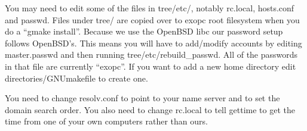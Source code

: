 \documentclass[11pt]{article}
\begin{document}
You may need to edit some of the files in tree/etc/, notably rc.local,
hosts.conf and passwd. Files under tree/ are copied over to exopc root
filesystem when you do a ``gmake install''. Because we use the OpenBSD
libc our password setup follows OpenBSD's. This means you will have to
add/modify accounts by editing master.passwd and then running
tree/etc/rebuild\_passwd. All of the passwords in that file are
currently ``exopc''. If you want to add a new home directory edit
directories/GNUmakefile to create one.

You need to change resolv.conf to point to your name server and to set
the domain search order. You also need to change rc.local to tell
gettime to get the time from one of your own computers rather than
ours.
\end{document}
